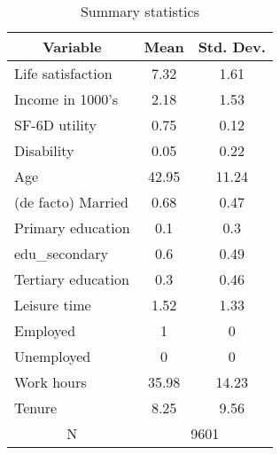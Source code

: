 
\begin{table}[htbp]\centering \caption{Summary statistics \label{descstat}}
\begin{tabular}{l c c  }\hline\hline
\multicolumn{1}{c}{\textbf{Variable}} & \textbf{Mean}
 & \textbf{Std. Dev.} \\ \hline
Life satisfaction & 7.32 & 1.61  \\
Income in 1000's & 2.18 & 1.53  \\
SF-6D utility & 0.75 & 0.12  \\
Disability & 0.05 & 0.22  \\
Age & 42.95 & 11.24  \\
(de facto) Married & 0.68 & 0.47  \\
Primary education & 0.1 & 0.3  \\
edu\_secondary & 0.6 & 0.49  \\
Tertiary education & 0.3 & 0.46  \\
Leisure time & 1.52 & 1.33  \\
Employed & 1 & 0  \\
Unemployed & 0 & 0  \\
Work hours & 35.98 & 14.23  \\
Tenure & 8.25 & 9.56  \\
\multicolumn{1}{c}{N} & \multicolumn{2}{c}{9601}\\ \hline\end{tabular}
\end{table}
